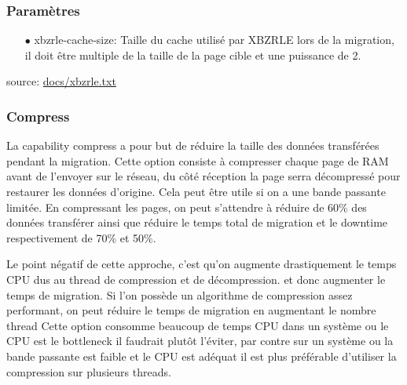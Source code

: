 \subsubsection*{Paramètres}
\begin{itemize}

 \item[$\bullet$]xbzrle-cache-size: Taille du cache utilisé par XBZRLE lors de la migration, il doit être multiple de la taille de la page cible et une puissance de 2.

\end{itemize}

source:  \url{docs/xbzrle.txt}

\subsubsection*{Compress}
La capability compress a pour but de réduire la taille des données transférées pendant la migration.
Cette option consiste à compresser chaque page de RAM avant de l'envoyer sur le réseau, du côté
réception la page serra décompressé pour restaurer les données d'origine.
Cela peut être utile si on a une bande passante limitée.
En compressant les pages, on peut s'attendre à réduire de 60\% des données transférer
ainsi que réduire le temps total de migration et le downtime respectivement de 70\% et 50\%.

Le point négatif de cette approche, c'est qu'on augmente drastiquement le temps CPU dus au thread de compression et de décompression.
et donc augmenter le temps de migration. Si l'on possède un algorithme de compression assez performant, on peut réduire le temps de migration en augmentant le nombre thread
Cette option consomme beaucoup de temps CPU dans un système ou le CPU est le bottleneck il faudrait plutôt l'éviter, par contre
sur un système ou la bande passante est faible et le CPU est adéquat il est plus préférable d'utiliser la compression sur plusieurs threads.
\newline
\newline
{}

